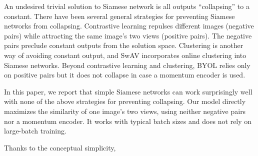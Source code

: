 \documentclass[conference]{IEEEtran}
\begin{document}
An undesired trivial solution to Siamese network is all outputs ``collapsing'' to a constant. There have been several general strategies for preventing Siamese networks from collapsing.
Contrastive learning repulses different images (negative pairs) while attracting the same image's two views (positive pairs).
The negative pairs preclude constant outputs from the solution space. 
Clustering is another way of avoiding constant output, and SwAV incorporates online clustering into Siamese networks. 
Beyond contrastive learning and clustering, BYOL relies only on positive pairs but it does not collapse in case a momentum encoder is used.

In this paper, we report that simple Siamese networks can work surprisingly well with none of the above strategies for preventing collapsing.
Our model directly maximizes the similarity of one image's two views, using neither negative pairs nor a momentum encoder.
It works with typical batch sizes and does not rely on large-batch training.

Thanks to the conceptual simplicity, 


\end{document}
